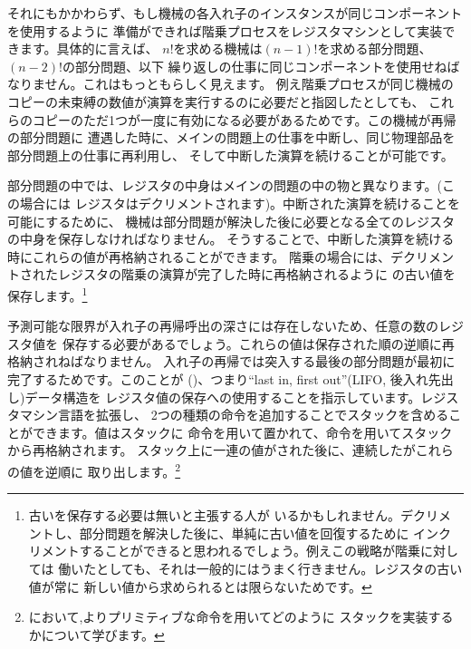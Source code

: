 \noindent
それにもかかわらず、もし機械の各入れ子のインスタンスが同じコンポーネントを使用するように
準備ができれば階乗プロセスをレジスタマシンとして実装できます。具体的に言えば、
\( n! \)を求める機械は\( (n - 1)! \)を求める部分問題、\( (n - 2)! \)の部分問題、以下
繰り返しの仕事に同じコンポーネントを使用せねばなりません。これはもっともらしく見えます。
例え階乗プロセスが同じ機械のコピーの未束縛の数値が演算を実行するのに必要だと指図したとしても、
これらのコピーのただ1つが一度に有効になる必要があるためです。この機械が再帰の部分問題に
遭遇した時に、メインの問題上の仕事を中断し、同じ物理部品を部分問題上の仕事に再利用し、
そして中断した演算を続けることが可能です。

部分問題の中では、レジスタの中身はメインの問題の中の物と異なります。(この場合には
レジスタはデクリメントされます)。中断された演算を続けることを可能にするために、
機械は部分問題が解決した後に必要となる全てのレジスタの中身を保存しなければなりません。
そうすることで、中断した演算を続ける時にこれらの値が再格納されることができます。
階乗の場合には、デクリメントされたレジスタの階乗の演算が完了した時に再格納されるように
の古い値を保存します。\footnote{古いを保存する必要は無いと主張する人が
いるかもしれません。デクリメントし、部分問題を解決した後に、単純に古い値を回復するために
インクリメントすることができると思われるでしょう。例えこの戦略が階乗に対しては
働いたとしても、それは一般的にはうまく行きません。レジスタの古い値が常に
新しい値から求められるとは限らないためです。}

予測可能な限界が入れ子の再帰呼出の深さには存在しないため、任意の数のレジスタ値を
保存する必要があるでしょう。これらの値は保存された順の逆順に再格納されねばなりません。
入れ子の再帰では突入する最後の部分問題が最初に完了するためです。このことが
()、つまり``last in, first out''(LIFO, 後入れ先出し)データ構造を
レジスタ値の保存への使用することを指示しています。レジスタマシン言語を拡張し、
2つの種類の命令を追加することでスタックを含めることができます。値はスタックに
命令を用いて置かれて、命令を用いてスタックから再格納されます。
スタック上に一連の値がされた後に、連続したがこれらの値を逆順に
取り出します。\footnote{において,よりプリミティブな命令を用いてどのように
スタックを実装するかについて学びます。}

